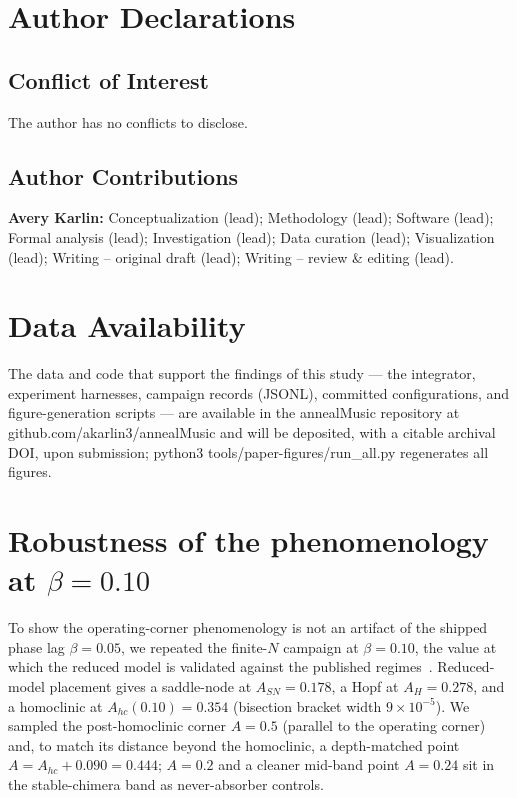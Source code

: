 \documentclass[11pt]{article}
\begin{document}
\section*{Author Declarations}

\subsection*{Conflict of Interest}
The author has no conflicts to disclose.

\subsection*{Author Contributions}
\textbf{Avery Karlin:} Conceptualization (lead); Methodology (lead); Software
(lead); Formal analysis (lead); Investigation (lead); Data curation (lead);
Visualization (lead); Writing -- original draft (lead); Writing -- review \&
editing (lead).

\section*{Data Availability}
The data and code that support the findings of this study --- the integrator,
experiment harnesses, campaign records (JSONL), committed configurations, and
figure-generation scripts --- are available in the annealMusic repository at
github.com/akarlin3/annealMusic and will be deposited, with a citable archival DOI,
upon submission; python3 tools/paper-figures/run\_all.py regenerates all figures.

\appendix

\section{Robustness of the phenomenology at $\beta = 0.10$}\label{app:beta}

To show the operating-corner phenomenology is not an artifact of the shipped phase
lag $\beta = 0.05$, we repeated the finite-$N$ campaign at $\beta = 0.10$, the value
at which the reduced model is validated against the published
regimes~\cite{abrams2008}. Reduced-model placement gives a saddle-node at
$A_{SN} = 0.178$, a Hopf at $A_H = 0.278$, and a homoclinic at
$A_{hc}(0.10) = 0.354$ (bisection bracket width $9\times10^{-5}$). We sampled the
post-homoclinic corner $A = 0.5$ (parallel to the operating corner) and, to match its
distance beyond the homoclinic, a depth-matched point
$A = A_{hc} + 0.090 = 0.444$; $A = 0.2$ and a cleaner mid-band point $A = 0.24$ sit
in the stable-chimera band as never-absorber controls.
\end{document}
